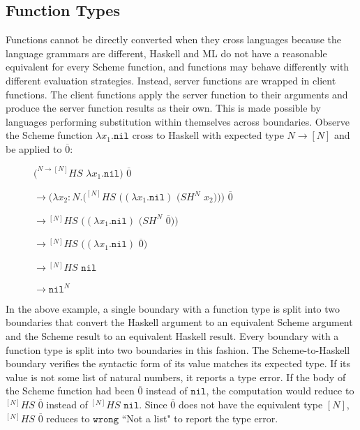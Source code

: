 \subsection{Function Types}

Functions cannot be directly converted when they cross languages because the language grammars are different, Haskell and ML do not have a reasonable equivalent for every Scheme function, and functions may behave differently with different evaluation strategies.  Instead, server functions are wrapped in client functions.  The client functions apply the server function to their arguments and produce the server function results as their own.  This is made possible by languages performing substitution within themselves across boundaries.  Observe the Scheme function $\lambda x_{1}.\mathtt{nil}$ cross to Haskell with expected type $N\rightarrow[N]$ and be applied to $\overline{0}$:

\begin{figure}[h]
$(^{N\rightarrow[N]}HS$ $\lambda x_{1}.\mathtt{nil})$ $\overline{0}$

\vspace{5pt}

$\rightarrow(\lambda x_{2}:N.(^{[N]}HS$ $((\lambda x_{1}.\mathtt{nil})$ $(SH^{N}$ $x_{2})))$ $\overline{0}$

\vspace{5pt}

$\rightarrow{^{[N]}H}S$ $((\lambda x_{1}.\mathtt{nil})$ $(SH^{N}$ $\overline{0}))$

\vspace{5pt}

$\rightarrow{^{[N]}H}S$ $((\lambda x_{1}.\mathtt{nil})$ $\overline{0})$

\vspace{5pt}

$\rightarrow{^{[N]}H}S$ $\mathtt{nil}$

\vspace{5pt}

$\rightarrow\mathtt{nil}^{N}$
\end{figure}

In the above example, a single boundary with a function type is split into two boundaries that convert the Haskell argument to an equivalent Scheme argument and the Scheme result to an equivalent Haskell result.  Every boundary with a function type is split into two boundaries in this fashion.  The Scheme-to-Haskell boundary verifies the syntactic form of its value matches its expected type.  If its value is not some list of natural numbers, it reports a type error.  If the body of the Scheme function had been $\overline{0}$ instead of $\mathtt{nil}$, the computation would reduce to $^{[N]}HS$ $\overline{0}$ instead of $^{[N]}HS$ $\mathtt{nil}$.  Since $\overline{0}$ does not have the equivalent type $[N]$, $^{[N]}HS$ $\overline{0}$ reduces to $\mathtt{wrong}$ ``Not a list" to report the type error.

